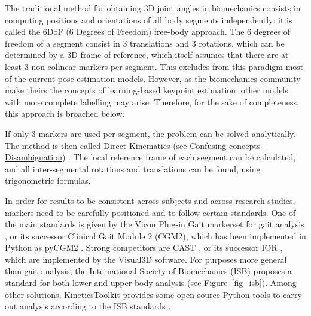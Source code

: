 The traditional method for obtaining 3D joint angles in biomechanics consists in computing positions and orientations of all body segments independently: it is called the 6DoF (6 Degrees of Freedom) free-body approach. The 6 degrees of freedom of a segment consist in 3 translations and 3 rotations, which can be determined by a 3D frame of reference, which itself assumes that there are at least 3 non-colinear markers per segment. This excludes from this paradigm most of the current pose estimation models. However, as the biomechanics community make theirs the concepts of learning-based keypoint estimation, other models with more complete labelling may arise. Therefore, for the sake of completeness, this approach is broached below.

If only 3 markers are used per segment, the problem can be solved analytically. The method is then called Direct Kinematics (see \hyperlink{Ann:gloss}{Confusing concepts - Disambiguation}) \cite{Lu1999}. The local reference frame of each segment can be calculated, and all inter-segmental rotations and translations can be found, using trigonometric formulas. 

In order for results to be consistent across subjects and across research studies, markers need to be carefully positioned and to follow certain standards. One of the main standards is given by the Vicon Plug-in Gait markerset for gait analysis \cite{Davis1991}, or its successor Clinical Gait Module 2 (CGM2), which has been implemented in Python as pyCGM2 \cite{Leboeuf2019b}. Strong competitors are CAST \cite{Cappozzo1995}, or its successor IOR \cite{Leardini2007}, which are implemented by the Visual3D software. For purposes more general than gait analysis, the International Society of Biomechanics (ISB) proposes a standard for both lower and upper-body analysis \cite{Wu2002, Wu2005} (see Figure~\ref{fig_isb}). Among other solutions, KineticsToolkit provides some open-source Python tools to carry out analysis according to the ISB standards \cite{Chenier2021}. 

\newpage

